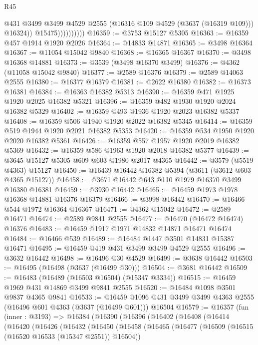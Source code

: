 \begin{lexlean}{R45}
\begin{coremodule}
                            @431
                            @3499
                            @3499
                            @4529
                            @2555
                            (@16316 @109 @4529 (@3637 (@16319 @109)))
                            @16324))
                        @15475))))))))))
@16359 := @3753 @15127 @5305
@16363 := @16359 @457 @1914 @1920 @2026
@16364 := @14833 @14871
@16365 := @3498 @16364
@16367 := @11054 @15042 @9840
@16368 := @16365 @16367
@16370 := @3498 @16368 @14881
@16373 := @3539 (@3498 @16370 @3499)
@16376 := @4362 (@11058 @15042 @9840)
@16377 := @2589 @16376
@16379 := @2589 @14063 @2555
@16380 := @16377 @16379
@16381 := @2622 @16380
@16382 := @16373 @16381
@16384 := @16363 @16382 @5313
@16390 := @16359 @471 @1925 @1920 @2025 @16382 @5321
@16396 := @16359 @482 @1930 @1920 @2024 @16382 @5329
@16402 := @16359 @493 @1936 @1920 @2023 @16382 @5337
@16408 := @16359 @506 @1940 @1920 @2022 @16382 @5345
@16414 := @16359 @519 @1944 @1920 @2021 @16382 @5353
@16420 := @16359 @534 @1950 @1920 @2020 @16382 @5361
@16426 := @16359 @557 @1957 @1920 @2019 @16382 @5369
@16432 := @16359 @586 @1963 @1920 @2018 @16382 @5377
@16439 := @3645 @15127 @5305 @609 @603 @1980 @2017 @4365
@16442 := @3579 (@5519 @4363) @15127
@16450 := @16439 @16442 @16382 @5394 (@3611 (@3612 @603 @4365 @15127))
@16458 := @3671 @16442 @643 @110 @1979 @16370 @3499 @16380 @16381
@16459 := @3930 @16442
@16465 := @16459 @1973 @1978 @16368 @14881 @16376 @16379
@16466 := @3998 @16442
@16470 := @16466 @544 @1972 @16364 @16367
@16471 := @4362 @15042
@16472 := @2589 @16471
@16474 := @2589 @9841 @2555
@16477 := @16470 (@16472 @16474) @16376
@16483 := @16459 @1917 @1971 @14832 @14871 @16471 @16474
@16484 := @16466 @539
@16489 := @16484 @1447 @3501 @14831 @15387 @16471
@16495 := @16459 @419 @431 @3499 @3499 @4529 @2555
@16496 := @3632 @16442
@16498 := @16496 @30 @4529
@16499 := @3638 @16442
@16503 := @16495 (@16498 (@3637 (@16499 @30)))
@16504 := @3681 @16442
@16509 := @16483 (@16489 (@16503 @16504) (@15347 @3334))
@16515 := @16459 @1969 @431 @14869 @3499 @9841 @2555
@16520 := @16484 @1098 @3501 @9837 @4365 @9841
@16533 := @16459 @1096 @431 @3499 @3499 @4363 @2555 (@16496 @601 @4363 (@3637 (@16499 @601))) @16504
@16579 := @16357
    (fun (inner : @3193) =>
    @16384
      (@16390
        (@16396
          (@16402
            (@16408
              (@16414
                (@16420
                  (@16426
                    (@16432
                      (@16450
                        (@16458
                          (@16465
                            (@16477
                              (@16509 (@16515 (@16520 @16533 (@15347 @2551)) @16504))

\end{coremodule}
\end{lexlean}
